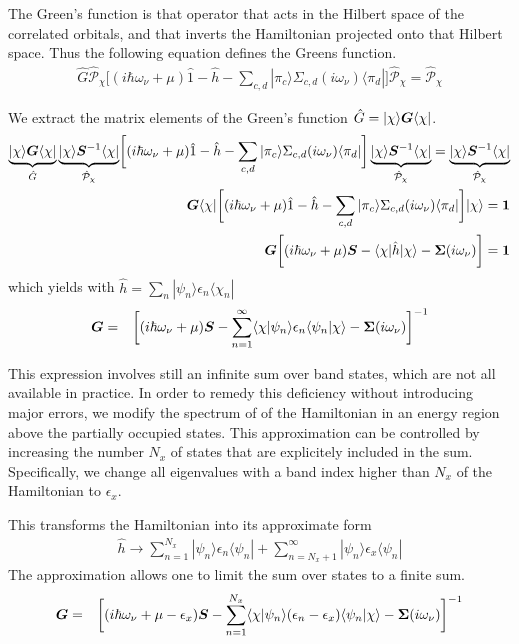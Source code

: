 \documentclass[11pt,a4paper]{report}
\begin{document}
The Green's function is that operator that acts in the Hilbert space
of the correlated orbitals, and that inverts the Hamiltonian projected
onto that Hilbert space. Thus the following equation defines the
Greens function.
\begin{eqnarray}
\hat{G}\hat{\mathcal{P}}_\chi
\biggl[(i\hbar\omega_\nu+\mu)\hat{1}-\hat{h}-\sum_{c,d}|\pi_c\rangle\Sigma_{c,d}(i\omega_\nu)\langle\pi_d|\biggr]
\hat{\mathcal{P}}_\chi=\hat{\mathcal{P}}_\chi
\end{eqnarray}

We extract the matrix elements of the Green's function
$\hat{G}=|\chi\rangle\bm{G}\langle\chi|$.
\begin{eqnarray}
\underbrace{|\chi\rangle \bm{G}\langle\chi|}_{\hat{G}}
\underbrace{|\chi\rangle \bm{S}^{-1}\langle\chi|}_{\hat{\mathcal{P}}_\chi}
\biggl[(i\hbar\omega_\nu+\mu)\hat{1}-\hat{h}-\sum_{c,d}|\pi_c\rangle\Sigma_{c,d}(i\omega_\nu)\langle\pi_d|\biggr]
\underbrace{|\chi\rangle \bm{S}^{-1}\langle\chi|}_{\hat{\mathcal{P}}_\chi}
=\underbrace{|\chi\rangle \bm{S}^{-1}\langle\chi|}_{\hat{\mathcal{P}}_\chi}
\nonumber\\
\bm{G}\langle\chi|
\biggl[(i\hbar\omega_\nu+\mu)\hat{1}-\hat{h}-\sum_{c,d}|\pi_c\rangle\Sigma_{c,d}(i\omega_\nu)\langle\pi_d|\biggr]
|\chi\rangle =\bm{1}
\nonumber\\
\bm{G}
\biggl[(i\hbar\omega_\nu+\mu)\bm{S}-\langle\chi|\hat{h}|\chi\rangle-\bm{\Sigma}(i\omega_\nu)\biggr]
=\bm{1}
\nonumber\\
\end{eqnarray}
which yields with $\hat{h}=\sum_n|\psi_n\rangle\epsilon_n\langle\chi_n|$
\begin{eqnarray}
\bm{G}&=&
\biggl[(i\hbar\omega_\nu+\mu)\bm{S}
-\sum_{n=1}^\infty
\langle\chi|\psi_n\rangle \epsilon_n\langle\psi_n|\chi\rangle-\bm{\Sigma}(i\omega_\nu)\biggr]^{-1}
\end{eqnarray}

This expression involves still an infinite sum over band states, which
are not all available in practice. In order to remedy this deficiency
without introducing major errors, we modify the spectrum of of the
Hamiltonian in an energy region above the partially occupied states.
This approximation can be controlled by increasing the number $N_x$ of
states that are explicitely included in the sum. Specifically, we
change all eigenvalues with a band index higher than $N_x$ of the
Hamiltonian to $\epsilon_x$.

This transforms the Hamiltonian into its approximate form
\begin{eqnarray}
\hat{h}\rightarrow\sum_{n=1}^{N_x}|\psi_n\rangle \epsilon_n\langle\psi_n|
+\sum_{n=N_x+1}^\infty|\psi_n\rangle \epsilon_x\langle\psi_n|
\end{eqnarray}
The approximation allows one to limit the sum over states to a finite sum.
\begin{eqnarray}
\bm{G}&=&
\biggl[(i\hbar\omega_\nu+\mu-\epsilon_x)\bm{S}-\sum_{n=1}^{N_x}
\langle\chi|\psi_n\rangle (\epsilon_n-\epsilon_x)\langle\psi_n|\chi\rangle-\bm{\Sigma}(i\omega_\nu)\biggr]^{-1}
\end{eqnarray}
\end{document}

